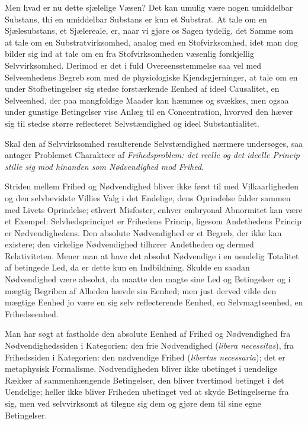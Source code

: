 \documentclass[12pt]{article}
\newcommand{\opage}[1]{\marginnote{\footnotesize\textit{[#1]}}}
\begin{document}
Men hvad er nu dette sjælelige Væsen? Det kan umulig være nogen
umiddelbar Substans, thi en umiddelbar Substans er kun et Substrat.
At tale om en Sjælesubstans, et Sjælereale,
\opage{60} er, naar vi gjøre os Sagen tydelig, det Samme som at tale om en
Substratvirksomhed, analog med en Stofvirksomhed, idet man dog
bilder sig ind at tale om en fra Stofvirksomheden væsenlig
forskjellig Selvvirksomhed. Derimod er det i fuld Overeensstemmelse
saa vel med Selveenhedens Begreb som med de physiologiske
Kjendsgjerninger, at tale om en under Stofbetingelser sig stedse
forstærkende Eenhed af ideel Causalitet, en Selveenhed, der paa
mangfoldige Maader kan hæmmes og svækkes, men ogsaa under gunstige
Betingelser vise Anlæg til en Concentration, hvorved den hæver sig
til stedse større reflecteret Selvstændighed og ideel
Substantialitet.

Skal den af Selvvirksomhed resulterende Selvstændighed nærmere
undersøges, saa antager Problemet Charakteer af \emph{Frihedsproblem:
det reelle og det ideelle Princip stille sig mod hinanden som
Nødvendighed mod Frihed}.

Striden mellem Frihed og Nødvendighed bliver ikke først til med
Vilkaarligheden og den selvbevidste Villies Valg i det Endelige,
dens Oprindelse falder sammen med Livets Oprindelse; ethvert
Misfoster, enhver embryonal Abnormitet kan være et Exempel:
Selvhedsprincipet er Frihedens Princip, ligesom Andethedens Princip
er Nødvendighedens. Den absolute Nødvendighed er et Begreb, der ikke
kan existere; den virkelige Nødvendighed tilhører Andetheden og
dermed Relativiteten. Mener man at have det absolut Nødvendige i en
uendelig Totalitet af betingede Led, da er dette kun en Indbildning.
Skulde en saadan Nødvendighed være absolut, da maatte den magte sine
Led og Betingelser og i mægtig Begriben af Alheden hævde sin Eenhed;
men just derved vilde den mægtige Eenhed jo være en sig selv
reflecterende Eenhed, en Selvmagtseenhed, en Frihedseenhed.

Man har søgt at fastholde den absolute Eenhed af Frihed og
Nødvendighed fra Nødvendighedssiden i Kategorien: den frie
Nødvendighed (\textit{libera necessitas}), fra Frihedssiden i
Kategorien: den nødvendige Frihed (\textit{libertas necessaria});
det er metaphysisk Formalisme. Nødvendigheden bliver ikke ubetinget
i uendelige
\opage{61} Rækker af sammenhængende Betingelser, den bliver tvertimod betinget
i det Uendelige; heller ikke bliver Friheden ubetinget ved at skyde
Betingelserne fra sig, men ved selvvirksomt at tilegne sig dem og
gjøre dem til sine egne Betingelser.
\end{document}
